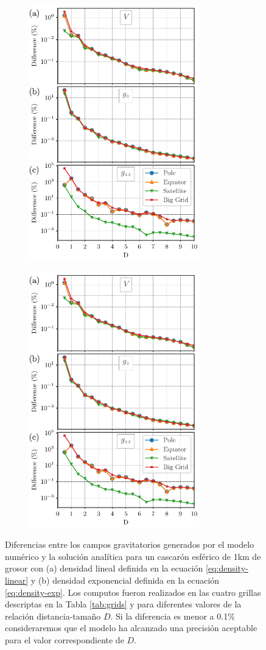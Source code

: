 \documentclass[a4paper,10pt]{article}
\begin{document}
\begin{figure}[t!]
    \begin{subfigure}[t]{0.5\textwidth}
    \centering
    \includegraphics[height=30em]{../manuscript/figures/Dlinear-thin-differences.pdf}
    \caption{}
    \label{fig:D-linear-thin}
    \end{subfigure}
    \quad
    \begin{subfigure}[t]{0.5\textwidth}
    \centering
    \includegraphics[height=30em]{../manuscript/figures/Dexp-shifted-thin-differences.pdf}
    \caption{}
    \label{fig:D-exp-thin}
    \end{subfigure}
    \caption{
        Diferencias entre los campos gravitatorios generados por el modelo numérico y la solución analítica para un cascarón esférico de 1km de grosor con (a) densidad lineal definida en la ecuación \ref{eq:density-linear} y (b) densidad exponencial definida en la ecuación \ref{eq:density-exp}. Los computos fueron realizados en las cuatro grillas descriptas en la Tabla \ref{tab:grids} y para diferentes valores de la relación distancia-tamaño $D$. Si la diferencia es menor a 0.1\% consideraremos que el modelo ha alcanzado una precisión aceptable para el valor correspondiente de $D$.
    }
\end{figure}
\end{document}
